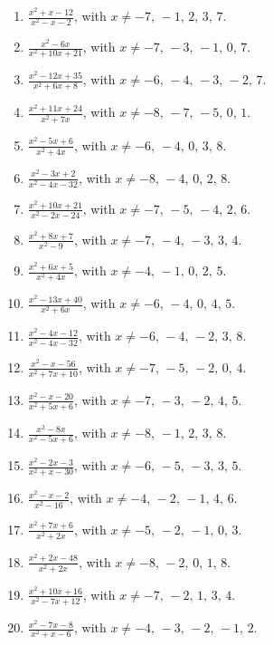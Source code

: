 \documentclass[11pt,oneside]{book}
\begin{document}
\begin{enumerate}[leftmargin=*,label=\textbf{L\arabic*.},itemsep=0.45\baselineskip]
\item $\displaystyle \frac{x^{2} + x - 12}{x^{2} - x - 2}$, with $x\ne -7,\,-1,\,2,\,3,\,7$.
\item $\displaystyle \frac{x^{2} - 6 x}{x^{2} + 10 x + 21}$, with $x\ne -7,\,-3,\,-1,\,0,\,7$.
\item $\displaystyle \frac{x^{2} - 12 x + 35}{x^{2} + 6 x + 8}$, with $x\ne -6,\,-4,\,-3,\,-2,\,7$.
\item $\displaystyle \frac{x^{2} + 11 x + 24}{x^{2} + 7 x}$, with $x\ne -8,\,-7,\,-5,\,0,\,1$.
\item $\displaystyle \frac{x^{2} - 5 x + 6}{x^{2} + 4 x}$, with $x\ne -6,\,-4,\,0,\,3,\,8$.
\item $\displaystyle \frac{x^{2} - 3 x + 2}{x^{2} - 4 x - 32}$, with $x\ne -8,\,-4,\,0,\,2,\,8$.
\item $\displaystyle \frac{x^{2} + 10 x + 21}{x^{2} - 2 x - 24}$, with $x\ne -7,\,-5,\,-4,\,2,\,6$.
\item $\displaystyle \frac{x^{2} + 8 x + 7}{x^{2} - 9}$, with $x\ne -7,\,-4,\,-3,\,3,\,4$.
\item $\displaystyle \frac{x^{2} + 6 x + 5}{x^{2} + 4 x}$, with $x\ne -4,\,-1,\,0,\,2,\,5$.
\item $\displaystyle \frac{x^{2} - 13 x + 40}{x^{2} + 6 x}$, with $x\ne -6,\,-4,\,0,\,4,\,5$.
\item $\displaystyle \frac{x^{2} - 4 x - 12}{x^{2} - 4 x - 32}$, with $x\ne -6,\,-4,\,-2,\,3,\,8$.
\item $\displaystyle \frac{x^{2} - x - 56}{x^{2} + 7 x + 10}$, with $x\ne -7,\,-5,\,-2,\,0,\,4$.
\item $\displaystyle \frac{x^{2} - x - 20}{x^{2} + 5 x + 6}$, with $x\ne -7,\,-3,\,-2,\,4,\,5$.
\item $\displaystyle \frac{x^{2} - 8 x}{x^{2} - 5 x + 6}$, with $x\ne -8,\,-1,\,2,\,3,\,8$.
\item $\displaystyle \frac{x^{2} - 2 x - 3}{x^{2} + x - 30}$, with $x\ne -6,\,-5,\,-3,\,3,\,5$.
\item $\displaystyle \frac{x^{2} - x - 2}{x^{2} - 16}$, with $x\ne -4,\,-2,\,-1,\,4,\,6$.
\item $\displaystyle \frac{x^{2} + 7 x + 6}{x^{2} + 2 x}$, with $x\ne -5,\,-2,\,-1,\,0,\,3$.
\item $\displaystyle \frac{x^{2} + 2 x - 48}{x^{2} + 2 x}$, with $x\ne -8,\,-2,\,0,\,1,\,8$.
\item $\displaystyle \frac{x^{2} + 10 x + 16}{x^{2} - 7 x + 12}$, with $x\ne -7,\,-2,\,1,\,3,\,4$.
\item $\displaystyle \frac{x^{2} - 7 x - 8}{x^{2} + x - 6}$, with $x\ne -4,\,-3,\,-2,\,-1,\,2$.

\end{enumerate}
\end{document}

